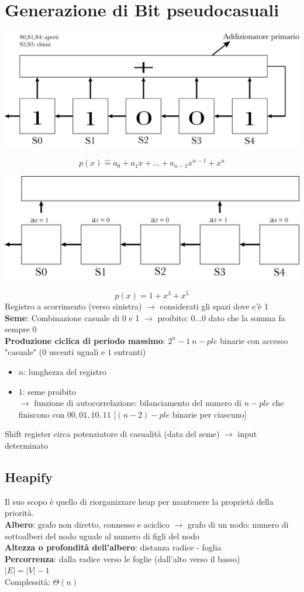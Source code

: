 \documentclass[12pt,a4paper]{article}
\begin{document}
\section{Generazione di Bit pseudocasuali}
\begin{center}
\includegraphics[width=1\columnwidth]{img/bit_pseudocasuali.png}
\end{center}
$$p(x)\hat = a_0 + a_1x + \dots + a_{n-1}x^{n-1} +x^n$$
\begin{center}
\includegraphics[width=0.7\columnwidth]{img/bit_pseudocasuali_bis.png}
\end{center}
$$p(x)=1+x^3+x^5$$
Registro a scorrimento (verso sinistra) $\rightarrow$ considerati gli spazi dove c'è 1\\
\textbf{Seme}: Combinazione casuale di 0 e 1 $\rightarrow$ proibito: $0\dots0$ dato che la somma fa sempre 0\\
\textbf{Produzione ciclica di periodo massimo}: $2^n -1 \ n-ple$ binarie con accesso "casuale" ($0$ uscenti uguali e $1$ entranti)
\begin{itemize}
\item $n$: lunghezza del registro
\item $1$: seme proibito\\
$\rightarrow$ funzione di autocorrelazione: bilanciamento del numero di $n-ple$ che finiscono con $00,01,10,11$ $[(n-2)-ple$ binarie per ciascuno$]$
\end{itemize}
Shift register circa potenziatore di casualità (data del seme) $\rightarrow$ input determinato

\subsection{Heapify}
Il suo scopo è quello di riorganizzare heap per mantenere la proprietà della priorità.\\
\textbf{Albero}: grafo non diretto, connesso e aciclico $\rightarrow$ grafo di un nodo: numero di sottoalberi del nodo uguale al numero di figli del nodo\\
\textbf{Altezza o profondità dell'albero}: distanza radice - foglia\\
\textbf{Percorrenza}: dalla radice verso le foglie (dall'alto verso il basso)\\
$|E|=|V|-1$\\
Complessità: $\Theta(n)$
\end{document}
